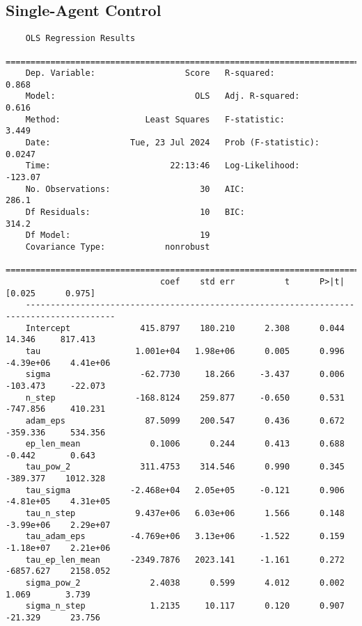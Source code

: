 \subsection{Single-Agent Control}
\label{tab:anova_sa}
\begin{verbatim}
    OLS Regression Results                            
    ==============================================================================
    Dep. Variable:                  Score   R-squared:                       0.868
    Model:                            OLS   Adj. R-squared:                  0.616
    Method:                 Least Squares   F-statistic:                     3.449
    Date:                Tue, 23 Jul 2024   Prob (F-statistic):             0.0247
    Time:                        22:13:46   Log-Likelihood:                -123.07
    No. Observations:                  30   AIC:                             286.1
    Df Residuals:                      10   BIC:                             314.2
    Df Model:                          19                                         
    Covariance Type:            nonrobust                                         
    ========================================================================================
                               coef    std err          t      P>|t|      [0.025      0.975]
    ----------------------------------------------------------------------------------------
    Intercept              415.8797    180.210      2.308      0.044      14.346     817.413
    tau                   1.001e+04   1.98e+06      0.005      0.996   -4.39e+06    4.41e+06
    sigma                  -62.7730     18.266     -3.437      0.006    -103.473     -22.073
    n_step                -168.8124    259.877     -0.650      0.531    -747.856     410.231
    adam_eps                87.5099    200.547      0.436      0.672    -359.336     534.356
    ep_len_mean              0.1006      0.244      0.413      0.688      -0.442       0.643
    tau_pow_2              311.4753    314.546      0.990      0.345    -389.377    1012.328
    tau_sigma            -2.468e+04   2.05e+05     -0.121      0.906   -4.81e+05    4.31e+05
    tau_n_step            9.437e+06   6.03e+06      1.566      0.148   -3.99e+06    2.29e+07
    tau_adam_eps         -4.769e+06   3.13e+06     -1.522      0.159   -1.18e+07    2.21e+06
    tau_ep_len_mean      -2349.7876   2023.141     -1.161      0.272   -6857.627    2158.052
    sigma_pow_2              2.4038      0.599      4.012      0.002       1.069       3.739
    sigma_n_step             1.2135     10.117      0.120      0.907     -21.329      23.756

\end{verbatim}
